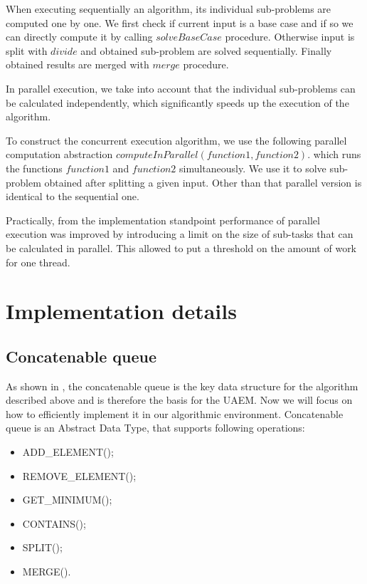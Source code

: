 \documentclass[twoside,twocolumn,10pt]{article}
\begin{document}
		When executing sequentially an algorithm, its individual sub-problems are computed one by one. We first check if current input is a base case and if so we can directly compute it by calling $solveBaseCase$ procedure. Otherwise input is split with $divide$ and obtained sub-problem are solved sequentially. Finally obtained results are merged with $merge$ procedure.

		In parallel execution, we take into account that the individual sub-problems can be calculated independently, which significantly speeds up the execution of the algorithm.

		To construct the concurrent execution algorithm, we use the following parallel computation abstraction $computeInParallel(function1, function2)$. which runs the functions $function1$ and $function2$ simultaneously. We use it to solve sub-problem obtained after splitting a given input. Other than that parallel version is identical to the sequential one.

		Practically, from the implementation standpoint performance of parallel execution was improved by introducing a limit on the size of sub-tasks that can be calculated in parallel. This allowed to put a threshold on the amount of work for one thread.

\section{Implementation details}
\label{sec:implementation-details}
\subsection{Concatenable queue}

		As shown in \cite{overmars}, the concatenable queue is the key data structure for the algorithm described above and is therefore the basis for the UAEM. Now we will focus on how to efficiently implement it in our algorithmic environment.
		Concatenable queue is an Abstract Data Type, that supports following operations:
		\begin{itemize}
			\item
			ADD\_ELEMENT();
			\item
			REMOVE\_ELEMENT();
			\item
			GET\_MINIMUM();
			\item
			CONTAINS();
			\item
			SPLIT();
			\item
			MERGE().
		\end{itemize}
\end{document}
